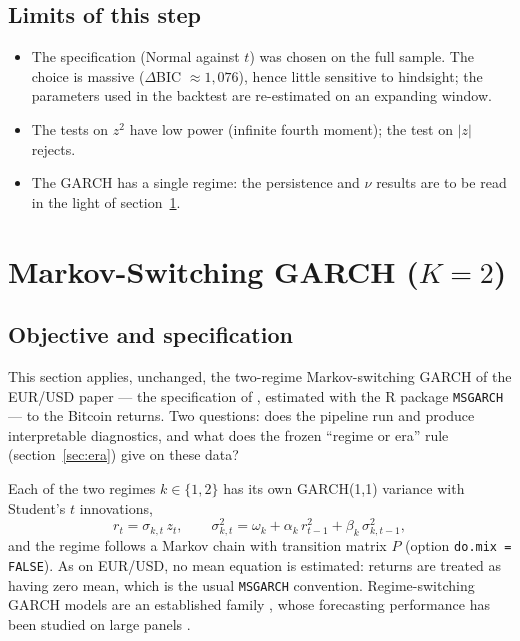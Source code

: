 \documentclass[12pt,a4paper]{article}
\begin{document}
\subsection{Limits of this step}

\begin{itemize}
	\item The specification (Normal against $t$) was chosen on the full sample. The choice is massive ($\Delta$BIC $\approx 1{,}076$), hence little sensitive to hindsight; the parameters used in the backtest are re-estimated on an expanding window.
	\item The tests on $z^2$ have low power (infinite fourth moment); the test on $|z|$ rejects.
	\item The GARCH has a single regime: the persistence and $\nu$ results are to be read in the light of section~\ref{sec:msgarch}.
\end{itemize}


\section{Markov-Switching GARCH ($K=2$)}
\label{sec:msgarch}

\subsection{Objective and specification}

This section applies, unchanged, the two-regime Markov-switching GARCH of the EUR/USD paper \citep{ZEWU2026fx} --- the specification of \citet{haasmittnikpaolella2004}, estimated with the R package \texttt{MSGARCH} \citep{ardia2019} --- to the Bitcoin returns. Two questions: does the pipeline run and produce interpretable diagnostics, and what does the frozen ``regime or era'' rule (section~\ref{sec:era}) give on these data?

Each of the two regimes $k\in\{1,2\}$ has its own GARCH(1,1) variance with Student's $t$ innovations,
\begin{equation}
	r_t = \sigma_{k,t}\, z_t, \qquad \sigma_{k,t}^2 = \omega_k + \alpha_k\, r_{t-1}^2 + \beta_k\, \sigma_{k,t-1}^2,
\end{equation}
and the regime follows a Markov chain with transition matrix $P$ (option \texttt{do.mix = FALSE}). As on EUR/USD, no mean equation is estimated: returns are treated as having zero mean, which is the usual \texttt{MSGARCH} convention. Regime-switching GARCH models are an established family \citep{hamiltonsusmel1994,gray1996}, whose forecasting performance has been studied on large panels \citep{ardia2018}.
\end{document}
